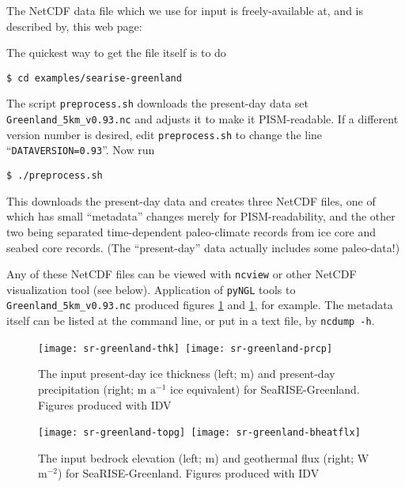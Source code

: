 The NetCDF data file which we use for input is freely-available at, and is described by, this web page: 
\medskip

\centerline{}
\medskip

\noindent The quickest way to get the file itself is to do

\verb|$ cd examples/searise-greenland|

\noindent The script \verb|preprocess.sh| downloads the present-day data set  \verb|Greenland_5km_v0.93.nc| and adjusts it to make it PISM-readable.  If a different version number is desired, edit \verb|preprocess.sh| to change the line ``\verb|DATAVERSION=0.93|''.  Now run

\verb|$ ./preprocess.sh|

\noindent This downloads the present-day data and creates three NetCDF files, one of which has small ``metadata'' changes merely for PISM-readability, and the other two being separated time-dependent paleo-climate records from ice core and seabed core records.  (The ``present-day'' data actually includes some paleo-data!)

Any of these NetCDF files can be viewed with \verb|ncview| or other NetCDF visualization tool (see below).  Application of \verb|pyNGL| tools to \verb|Greenland_5km_v0.93.nc| produced figures \ref{fig:sr-input1} and  \ref{fig:sr-input1}, for example.  The metadata itself can be listed at the command line, or put in a text file, by \verb|ncdump -h|.

\begin{figure}[ht]
\mbox{\texttt{[image: sr-greenland-thk]}
 \quad\texttt{[image: sr-greenland-prcp]}}
\caption{The input present-day ice thickness (left; m) and present-day precipitation (right; m $\text{a}^{-1}$ ice equivalent) for SeaRISE-Greenland.  Figures produced with IDV}
\label{fig:sr-input1}
\end{figure}

\begin{figure}[ht]
\mbox{\texttt{[image: sr-greenland-topg]}
 \quad \texttt{[image: sr-greenland-bheatflx]}}
\caption{The input bedrock elevation (left; m) and geothermal flux (right; W $\text{m}^{-2}$) for SeaRISE-Greenland.  Figures produced with IDV}
\label{fig:sr-input2}
\end{figure}


